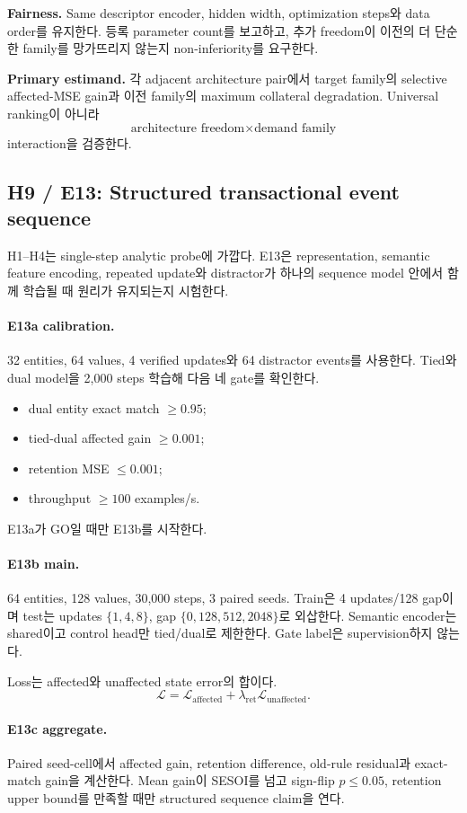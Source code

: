 \documentclass[10.3pt,a4paper]{article}
\begin{document}
\textbf{Fairness.} Same descriptor encoder, hidden width, optimization steps와 data order를 유지한다. 등록 parameter count를 보고하고, 추가 freedom이 이전의 더 단순한 family를 망가뜨리지 않는지 non-inferiority를 요구한다.

\textbf{Primary estimand.} 각 adjacent architecture pair에서 target family의 selective affected-MSE gain과 이전 family의 maximum collateral degradation. Universal ranking이 아니라
\[
\text{architecture freedom}\times\text{demand family}
\]
interaction을 검증한다.

\subsection{H9 / E13: Structured transactional event sequence}
H1--H4는 single-step analytic probe에 가깝다. E13은 representation, semantic feature encoding, repeated update와 distractor가 하나의 sequence model 안에서 함께 학습될 때 원리가 유지되는지 시험한다.

\paragraph{E13a calibration.}
32 entities, 64 values, 4 verified updates와 64 distractor events를 사용한다. Tied와 dual model을 2,000 steps 학습해 다음 네 gate를 확인한다.
\begin{itemize}
\item dual entity exact match $\ge0.95$;
\item tied-dual affected gain $\ge0.001$;
\item retention MSE $\le0.001$;
\item throughput $\ge100$ examples/s.
\end{itemize}
E13a가 GO일 때만 E13b를 시작한다.

\paragraph{E13b main.}
64 entities, 128 values, 30,000 steps, 3 paired seeds. Train은 4 updates/128 gap이며 test는 updates $\{1,4,8\}$, gap $\{0,128,512,2048\}$로 외삽한다. Semantic encoder는 shared이고 control head만 tied/dual로 제한한다. Gate label은 supervision하지 않는다.

Loss는 affected와 unaffected state error의 합이다.
\[
\mathcal L=\mathcal L_{\mathrm{affected}}+
\lambda_{\mathrm{ret}}\mathcal L_{\mathrm{unaffected}}.
\]

\paragraph{E13c aggregate.}
Paired seed-cell에서 affected gain, retention difference, old-rule residual과 exact-match gain을 계산한다. Mean gain이 SESOI를 넘고 sign-flip $p\le0.05$, retention upper bound를 만족할 때만 structured sequence claim을 연다.
\end{document}

